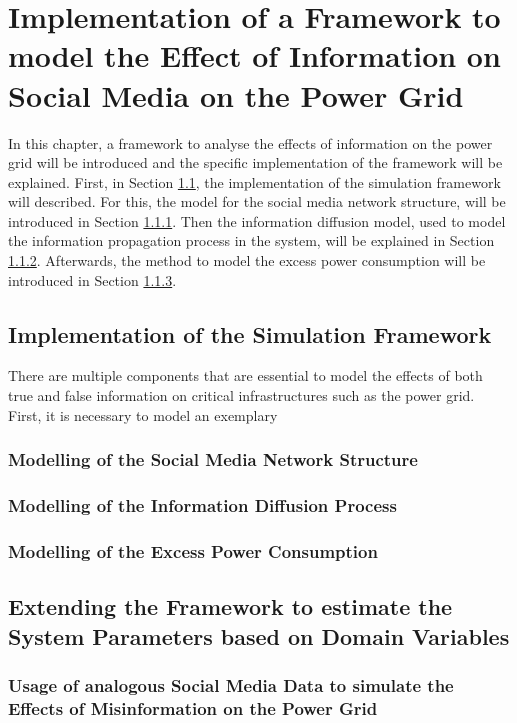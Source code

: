 \chapter{Implementation of a Framework to model the Effect
of Information on Social Media on the Power Grid}

In this chapter, a framework to analyse the effects of information on the 
power grid will be introduced and the specific implementation of the 
framework will be explained.
First, in Section \ref{simulationframeworksection}, 
the implementation of the simulation framework will described.
For this, the model for the social media network structure,
will be introduced in Section \ref{socialmediaimplementation}.
Then the information diffusion model, used to model the information 
propagation process in the system, will be explained in Section 
\ref{infodiffusionimplementation}. Afterwards, the method to 
model the excess power consumption will be introduced in Section 
\ref{powerconsumptionimplementation}. 

\section{Implementation of the Simulation Framework}
\label{simulationframeworksection}
There are multiple components that are essential to model the effects of 
both true and false information on critical infrastructures
such as the power grid. First, it is necessary to model an 
exemplary 
\subsection{Modelling of the Social Media Network Structure}
\label{socialmediaimplementation}



\subsection{Modelling of the Information Diffusion Process}
\label{infodiffusionimplementation}

\subsection{Modelling of the Excess Power Consumption}
\label{powerconsumptionimplementation}


\section{Extending the Framework to estimate the System Parameters based on
Domain Variables}


\subsection{Usage of analogous Social Media Data to simulate the Effects of 
Misinformation on the Power Grid}